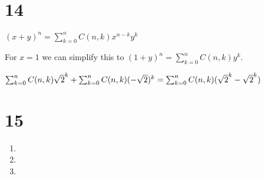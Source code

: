 \documentclass[12pt]{article}
\begin{document}
\section*{14}
$(x + y)^n = \sum_{k = 0}^{n} C(n, k) x^{n - k} y^k$

For $x = 1$ we can simplify this to $(1 + y)^n = \sum_{k = 0}^{n} C(n, k) y^k$.

$\sum_{k = 0}^{n} C(n, k) \sqrt{2}^k + \sum_{k = 0}^{n} C(n, k) (-\sqrt{2})^k\\
=\sum_{k = 0}^{n} C(n, k)(\sqrt{2}^k - \sqrt{2}^k)$

\section*{15}
\begin{enumerate}[a]
	\item %
	\item %
	\item %
\end{enumerate}
\end{document}
